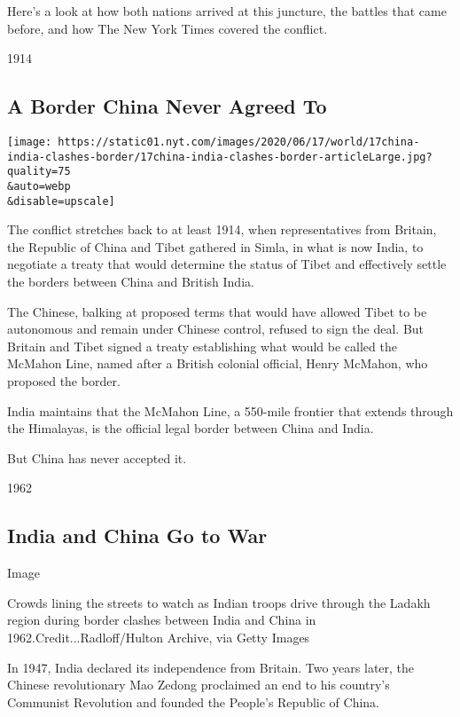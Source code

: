 Here's a look at how both nations arrived at this juncture, the battles
that came before, and how The New York Times covered the conflict.

1914

\hypertarget{a-border-china-never-agreed-to}{%
\subsection{A Border China Never Agreed
To}\label{a-border-china-never-agreed-to}}

\texttt{[image: https://static01.nyt.com/images/2020/06/17/world/17china-india-clashes-border/17china-india-clashes-border-articleLarge.jpg?quality=75\\\&auto=webp\\\&disable=upscale]}

The conflict stretches back to at least 1914, when representatives from
Britain, the Republic of China and Tibet gathered in Simla, in what is
now India, to negotiate a treaty that would determine the status of
Tibet and effectively settle the borders between China and British
India.

The Chinese, balking at proposed terms that would have allowed Tibet to
be autonomous and remain under Chinese control, refused to sign the
deal. But Britain and Tibet signed a treaty establishing what would be
called the McMahon Line, named after a British colonial official, Henry
McMahon, who proposed the border.

India maintains that the McMahon Line, a 550-mile frontier that extends
through the Himalayas, is the official legal border between China and
India.

But China has never accepted it.

1962

\hypertarget{india-and-china-go-to-war}{%
\subsection{India and China Go to War}\label{india-and-china-go-to-war}}

Image

Crowds lining the streets to watch as Indian troops drive through the
Ladakh region during border clashes between India and China in
1962.Credit...Radloff/Hulton Archive, via Getty Images

In 1947, India declared its independence from Britain. Two years later,
the Chinese revolutionary Mao Zedong proclaimed an end to his country's
Communist Revolution and founded the People's Republic of China.

